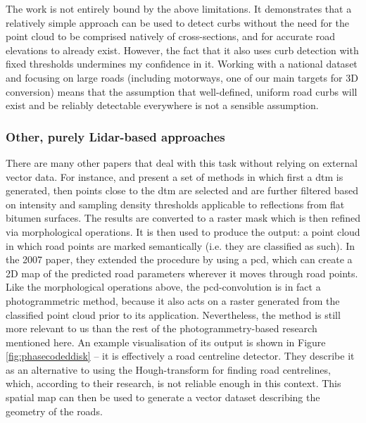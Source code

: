 The work \cite{vosselman_zhou_2009} is not entirely bound by the above limitations. It demonstrates that a relatively simple approach can be used to detect curbs without the need for the point cloud to be comprised natively of cross-sections, and for accurate road elevations to already exist. However, the fact that it also uses curb detection with fixed thresholds undermines my confidence in it. Working with a national dataset and focusing on large roads (including motorways, one of our main targets for 3D conversion) means that the assumption that well-defined, uniform road curbs will exist and be reliably detectable everywhere is not a sensible assumption.

\subsubsection{Other, purely Lidar-based approaches}

There are many other papers that deal with this task without relying on external vector data. For instance, \cite{clode_etal_2004} and \cite{clode_etal_2007} present a set of methods in which first a \ac{dtm} is generated, then points close to the \ac{dtm} are selected and are further filtered based on intensity and sampling density thresholds applicable to reflections from flat bitumen surfaces. The results are converted to a raster mask which is then refined via morphological operations. It is then used to produce the output: a point cloud in which road points are marked semantically (i.e. they are classified as such). In the 2007 paper, they extended the procedure by using a \ac{pcd}, which can create a 2D map of the predicted road parameters wherever it moves through road points. Like the morphological operations above, the \ac{pcd}-convolution is in fact a photogrammetric method, because it also acts on a raster generated from the classified point cloud prior to its application. Nevertheless, the method is still more relevant to us than the rest of the photogrammetry-based research mentioned here. An example visualisation of its output is shown in Figure \ref{fig:phasecodeddisk} – it is effectively a road centreline detector. They describe it as an alternative to using the Hough-transform for finding road centrelines, which, according to their research, is not reliable enough in this context. This spatial map can then be used to generate a vector dataset describing the geometry of the roads.

